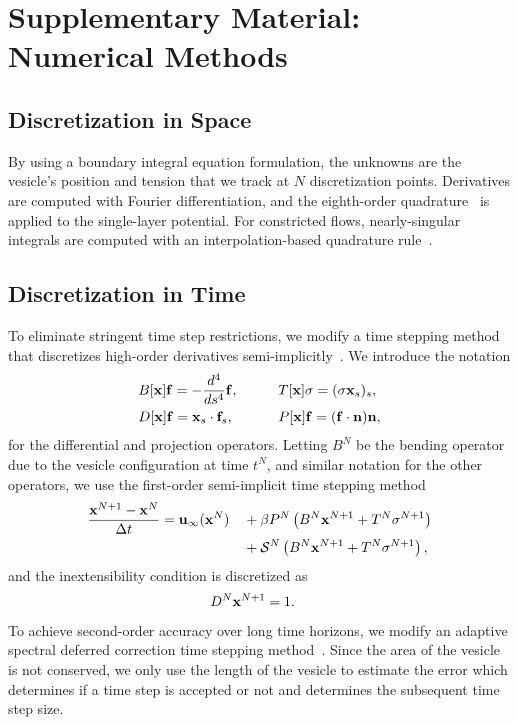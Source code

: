 \documentclass[9pt,twocolumn,twoside,lineno]{pnas-new}
\begin{document}
\section*{Supplementary Material: Numerical Methods}

\subsection*{Discretization in Space}
By using a boundary integral equation formulation, the unknowns are the
vesicle's position and tension that we track at $N$ discretization
points. Derivatives are computed with Fourier differentiation, and the
eighth-order quadrature~\cite{alp1999} is applied to the single-layer
potential. For constricted flows, nearly-singular integrals are computed
with an interpolation-based quadrature rule~\cite{qua-bir2014}.

\subsection*{Discretization in Time}
To eliminate stringent time step restrictions, we modify a time stepping
method that discretizes high-order derivatives
semi-implicitly~\cite{vee-gue-zor-bir2009}. We introduce the notation
\begin{alignat}{3}
  &B[\mathbf{x}]\mathbf{f} = -\frac{d^4}{ds^4} \mathbf{f},  \qquad
  &&T[\mathbf{x}]\sigma = (\sigma \mathbf{x}_s)_s, \\
  &D[\mathbf{x}]\mathbf{f} = \mathbf{x}_s \cdot \mathbf{f}_s, 
  &&P[\mathbf{x}]\mathbf{f} = (\mathbf{f} \cdot \mathbf{n}) \mathbf{n},
\end{alignat}
for the differential and projection operators. Letting $B^N$ be the
bending operator due to the vesicle configuration at time $t^N$, and
similar notation for the other operators, we use the first-order
semi-implicit time stepping method
\begin{alignat}{3}  
  \frac{\mathbf{x}^{N+1} - \mathbf{x}^N}{\Delta t} &= \mathbf{u}_\infty(\mathbf{x}^N) 
  &&+ \beta P^N\left(B^N\mathbf{x}^{N+1} + T^N\sigma^{N+1}\right) \nonumber \\
  & &&+ \mathcal{S}^N\left(B^N\mathbf{x}^{N+1} + T^N\sigma^{N+1}\right), 
\end{alignat}
and  the inextensibility condition is discretized as
\begin{align}
  D^N\mathbf{x}^{N+1} &= 1.
\end{align}
To achieve second-order accuracy over long time horizons, we modify an
adaptive spectral deferred correction time stepping
method~\cite{qua-bir2016}. Since the area of the vesicle is not
conserved, we only use the length of the vesicle to estimate the error
which determines if a time step is accepted or not and determines the
subsequent time step size.
\end{document}
